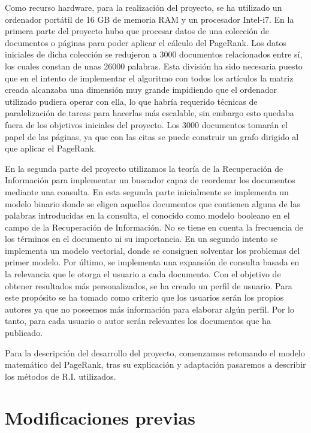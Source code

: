 \documentclass[size=a4, parskip=half, titlepage=false, toc=flat, toc=bib, 12pt, twoside]{scrartcl}
\theoremstyle{theorem-style}
\theoremstyle{definition-style}
\theoremstyle{remark-style}
\theoremstyle{example-style}
\theoremstyle{definition-style}
\theoremstyle{remark-style}
\begin{document}
Como recurso hardware, para la realización del proyecto, se ha utilizado un ordenador portátil de 16 GB de memoria RAM y un procesador Intel-i7. En la primera parte del proyecto hubo que procesar datos de una colección de documentos o páginas para poder aplicar el cálculo del PageRank. Los datos iniciales de dicha colección se redujeron a 3000 documentos relacionados entre sí, los cuales constan de unas 26000 palabras. Esta división ha sido necesaria puesto que en el intento de implementar el algoritmo con todos los artículos la matriz creada alcanzaba una dimensión muy grande impidiendo que el ordenador utilizado pudiera operar con ella, lo que habría requerido técnicas de paralelización de tareas para hacerlas más escalable, sin embargo esto quedaba fuera de los objetivos iniciales del proyecto. Los 3000 documentos tomarán el papel de las páginas, ya que con las citas se puede construir un grafo dirigido al que aplicar el PageRank.

En la segunda parte del proyecto utilizamos la teoría de la Recuperación de Información para implementar un buscador capaz de reordenar los documentos mediante una consulta. En esta segunda parte inicialmente se implementa un modelo binario donde se eligen aquellos documentos que contienen alguna de las palabras introducidas en la consulta, el conocido como modelo booleano en el campo de la Recuperación de Información. No se tiene en cuenta la frecuencia de los términos en el documento ni su importancia. En un segundo intento se implementa un modelo vectorial, donde se consiguen solventar los problemas del primer modelo. Por último, se implementa una expansión de consulta basada en la relevancia que le otorga el usuario a cada documento. Con el objetivo de obtener resultados más personalizados, se ha creado un perfil de usuario. Para este propósito se ha tomado como criterio que los usuarios serán los propios autores ya que no poseemos más información para elaborar algún perfil. Por lo tanto, para cada usuario o autor serán relevantes los documentos que ha publicado.

Para la descripción del desarrollo del proyecto, comenzamos retomando el modelo matemático del PageRank, tras su explicación y adaptación pasaremos a describir los métodos de R.I. utilizados.

\newpage

\section{Modificaciones previas}
\end{document}
